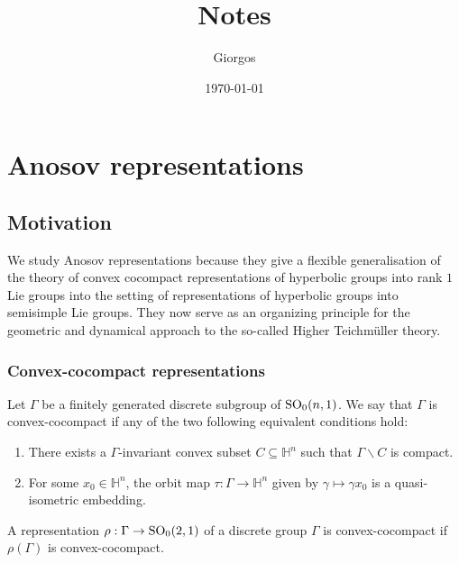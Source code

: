 \documentclass{report}
\title{Notes}
\author{Giorgos}
\date{\today}
\begin{document}
\maketitle

\tableofcontents

\chapter{Anosov representations}
\section{Motivation}
We study Anosov representations because they give a flexible generalisation of the theory of convex cocompact representations of hyperbolic groups into rank $1$ Lie groups into the setting of representations of hyperbolic groups into semisimple Lie groups.
They now serve as an organizing principle for the geometric and dynamical approach to the so-called Higher Teichmüller theory.

\subsection{Convex-cocompact representations}
\begin{definition}
    Let $\Gamma$ be a finitely generated discrete subgroup of $\operatorname{{\mathrm{SO}}}_0(n,1)$.
    We say that $\Gamma$ is convex-cocompact if any of the two following equivalent conditions hold:
    \begin{enumerate}[label=(\roman*)]
        \item There exists a $\Gamma$-invariant convex subset $C \subseteq \mathbb H^n$ such that $\Gamma \backslash C$ is compact.
        \item For some $x_0 \in \mathbb H^n$, the orbit map $\tau: \Gamma \to \mathbb H^n$ given by $\gamma \mapsto \gamma x_0$ is a quasi-isometric embedding.
    \end{enumerate}
    A representation $\rho:\Gamma \to \operatorname{{\mathrm{SO}}}_0(2,1)$ of a discrete group $\Gamma$ is convex-cocompact if $\rho(\Gamma)$ is convex-cocompact.
\end{definition}
\end{document}
